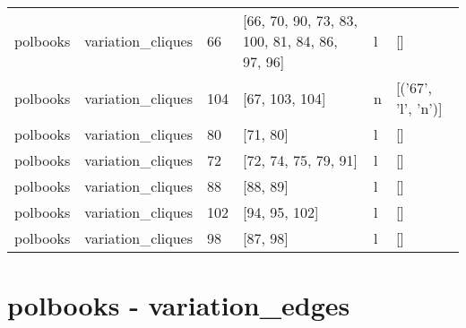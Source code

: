 \begin{tabular}{llllll}
polbooks & variation_cliques & 66 & [66, 70, 90, 73, 83, 100, 81, 84, 86, 97, 96] & l & [] \\
polbooks & variation_cliques & 104 & [67, 103, 104] & n & [('67', 'l', 'n')] \\
polbooks & variation_cliques & 80 & [71, 80] & l & [] \\
polbooks & variation_cliques & 72 & [72, 74, 75, 79, 91] & l & [] \\
polbooks & variation_cliques & 88 & [88, 89] & l & [] \\
polbooks & variation_cliques & 102 & [94, 95, 102] & l & [] \\
polbooks & variation_cliques & 98 & [87, 98] & l & [] \\
\bottomrule
\end{tabular}


\section*{polbooks - variation_edges}
